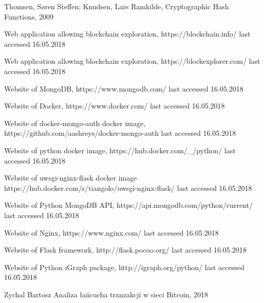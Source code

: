 \documentclass[12pt, en, eng, oneside, final]{mgr}
\begin{document}
\begin{thebibliography}{9}
Thomsen, Søren Steffen; Knudsen, Lars Ramkilde, Cryptographic Hash Functions, 2009

Web application allowing blockchain exploration, https://blockchain.info/ last accessed 16.05.2018

Web application allowing blockchain exploration, https://blockexplorer.com/ last accessed 16.05.2018

Website of MongoDB, https://www.mongodb.com/ last accessed 16.05.2018

Website of Docker, https://www.docker.com/ last accessed 16.05.2018

Website of docker-mongo-auth docker image, https://github.com/aashreys/docker-mongo-auth last accessed 16.05.2018

Website of python docker image, https://hub.docker.com/\_/python/ last accessed 16.05.2018

Website of uwsgi-nginx-flask docker image https://hub.docker.com/r/tiangolo/uwsgi-nginx-flask/ last accessed 16.05.2018

Website of Python MongoDB API, https://api.mongodb.com/python/current/ last accessed 16.05.2018

Website of Nginx, https://www.nginx.com/ last accessed 16.05.2018

Website of Flask framework, http://flask.pocoo.org/ last accessed 16.05.2018

Website of Python iGraph package, http://igraph.org/python/ last accessed 16.05.2018

Zychal Bartosz Analiza łańcucha tranzakcji w sieci Bitcoin, 2018

\end{thebibliography}
\end{document}
